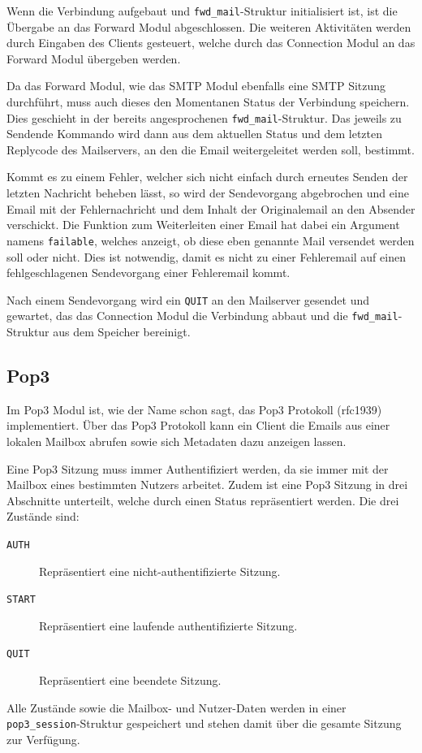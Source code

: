\documentclass[final,a4paper,11pt,notitlepage,halfparskip]{scrreprt}
\begin{document}
Wenn die Verbindung aufgebaut und \texttt{fwd\_mail}-Struktur initialisiert ist,
ist die Übergabe an das Forward Modul abgeschlossen. Die weiteren Aktivitäten
werden durch Eingaben des Clients gesteuert, welche durch das Connection Modul
an das Forward Modul übergeben werden.

Da das Forward Modul, wie das SMTP Modul ebenfalls eine SMTP Sitzung
durchführt, muss auch dieses den Momentanen Status der Verbindung speichern.
Dies geschieht in der bereits angesprochenen \texttt{fwd\_mail}-Struktur. Das
jeweils zu Sendende Kommando wird dann aus dem aktuellen Status und dem letzten
Replycode des Mailservers, an den die Email weitergeleitet werden soll,
bestimmt.

Kommt es zu einem Fehler, welcher sich nicht einfach durch erneutes Senden der
letzten Nachricht beheben lässt, so wird der Sendevorgang abgebrochen und eine
Email mit der Fehlernachricht und dem Inhalt der Originalemail an den Absender
verschickt. Die Funktion zum Weiterleiten einer Email hat dabei ein Argument
namens \texttt{failable}, welches anzeigt, ob diese eben genannte Mail versendet
werden soll oder nicht. Dies ist notwendig, damit es nicht zu einer Fehleremail
auf einen fehlgeschlagenen Sendevorgang einer Fehleremail kommt.

Nach einem Sendevorgang wird ein \texttt{QUIT} an den Mailserver gesendet und
gewartet, das das Connection Modul die Verbindung abbaut und die
\texttt{fwd\_mail}-Struktur aus dem Speicher bereinigt.


\subsection{Pop3}\label{sec:umsetzung-pop3}
Im Pop3 Modul ist, wie der Name schon sagt, das Pop3 Protokoll (rfc1939)
implementiert. Über das Pop3 Protokoll kann ein Client die Emails aus einer
lokalen Mailbox abrufen sowie sich Metadaten dazu anzeigen lassen.

Eine Pop3 Sitzung muss immer Authentifiziert werden, da sie immer mit der
Mailbox eines bestimmten Nutzers arbeitet. Zudem ist eine Pop3 Sitzung in drei
Abschnitte unterteilt, welche durch einen Status repräsentiert werden. Die drei
Zustände sind:
\begin{description}
    \item[\texttt{AUTH}] Repräsentiert eine nicht-authentifizierte Sitzung.
    \item[\texttt{START}] Repräsentiert eine laufende authentifizierte Sitzung.
    \item[\texttt{QUIT}] Repräsentiert eine beendete Sitzung.	
\end{description}
Alle Zustände sowie die Mailbox- und Nutzer-Daten werden in einer
\texttt{pop3\_session}-Struktur gespeichert und stehen damit über die gesamte
Sitzung zur Verfügung. 
\end{document}
